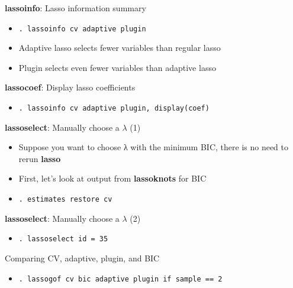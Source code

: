 \documentclass{beamer}
\begin{document}
\begin{frame}{\textbf{lassoinfo}: Lasso information summary}
	\begin{itemize}
		\item [] \small{\texttt{. lassoinfo cv adaptive plugin}}
	\end{itemize}
	\begin{itemize}
		\item Adaptive lasso selects fewer variables than regular lasso
		\item Plugin selects even fewer variables than adaptive lasso
	\end{itemize}
\end{frame}

\begin{frame}{\textbf{lassocoef}: Display lasso coefficients}
	\begin{itemize}
		\item [] \small{\texttt{. lassoinfo cv adaptive plugin, display(coef)}}
	\end{itemize}
\end{frame}

\begin{frame}{\textbf{lassoselect}: Manually choose a $\lambda$ (1)}
	\begin{itemize}
	\item Suppose you want to choose λ with the minimum BIC, there is no need to rerun \textbf{lasso} 
	\item First, let’s look at output from \textbf{lassoknots} for BIC
	\end{itemize}
	\begin{itemize}
		\item [] \small{\texttt{. estimates restore cv}}
	\end{itemize}
\end{frame}

\begin{frame}{\textbf{lassoselect}: Manually choose a $\lambda$ (2)}
	\begin{itemize}
		\item [] \small{\texttt{. lassoselect id = 35}}
	\end{itemize}
\end{frame}

\begin{frame}{Comparing CV, adaptive, plugin, and BIC}
	\begin{itemize}
		\item [] \small{\texttt{. lassogof cv bic adaptive plugin if sample == 2}}
	\end{itemize}
\end{frame}
\end{document}
